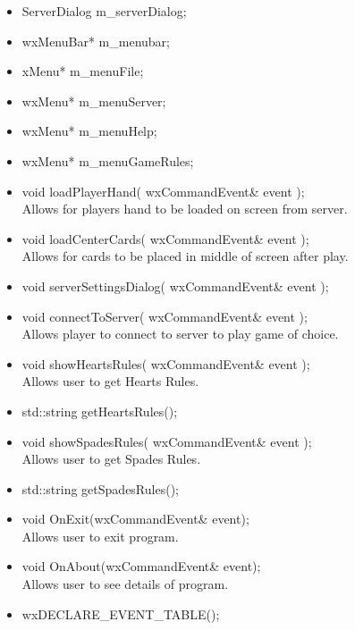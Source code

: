 \documentclass[]{scrartcl}
\begin{document}
\begin{itemize}
 		\begin{itemize}
 			\item ServerDialog m\_serverDialog;
 			\item wxMenuBar* m\_menubar;
 			\item xMenu* m\_menuFile;
 			\item wxMenu* m\_menuServer;
 			\item wxMenu* m\_menuHelp;
 			\item wxMenu* m\_menuGameRules;
 			\item void loadPlayerHand( wxCommandEvent\& event );
 				\\Allows for players hand to be loaded on screen from server.
 			\item void loadCenterCards( wxCommandEvent\& event );
 				\\Allows for cards to be placed in middle of screen after play.
 			\item void serverSettingsDialog( wxCommandEvent\& event );
 			\item void connectToServer( wxCommandEvent\& event );
 				\\Allows player to connect to server to play game of choice.
 			\item void showHeartsRules( wxCommandEvent\& event );
 				\\Allows user to get Hearts Rules.
 			\item std::string getHeartsRules();
 			\item void showSpadesRules( wxCommandEvent\& event );
 				\\Allows user to get Spades Rules.
 			\item std::string getSpadesRules();
 			\item void OnExit(wxCommandEvent\& event);
 				\\Allows user to exit program.
 			\item void OnAbout(wxCommandEvent\& event);
 				\\Allows user to see details of program.
 			\item wxDECLARE\_EVENT\_TABLE();
 		\end{itemize}
 	\end{itemize}
\end{document}
